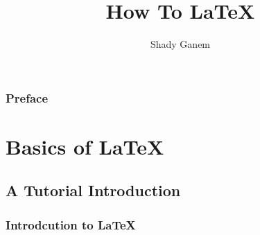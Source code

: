 \documentclass[12pt]{book}
\title{How To \LaTeX}
\author{Shady Ganem}
\begin{document}
\maketitle

\section*{Preface}

{
\hypersetup{linkcolor=black}
\tableofcontents
}
\newpage
{}%
\part{Basics of \LaTeX}

\chapter{A Tutorial Introduction}

\section{Introdcution to \LaTeX \ }
\end{document}
